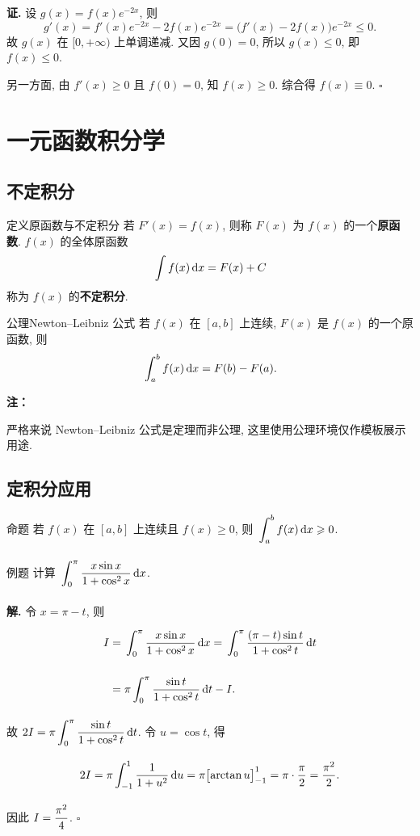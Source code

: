 \documentclass[a4paper,12pt,oneside,fontset=none]{ctexbook}
\renewcommand{\ge}{\geqslant}
\renewcommand{\le}{\leqslant}
\let\olddfrac\dfrac
\renewcommand{\dfrac}[2]{
	\olddfrac{#1\vrule width 0pt height 1.15em depth 0em}{#2\vrule width 0pt height 0em depth 0.6em}
}
\let\oldint\int
\renewcommand{\int}{\displaystyle{\vrule width 0pt height 0em depth 0em}\oldint}
\newenvironment{proposition}[1][]{\begin{thmBox}{命题}{#1}}{\end{thmBox}}
\newcounter{definition}[chapter]
\newenvironment{definition}[1][]{\begin{defBox}{定义}{#1}}{\end{defBox}}
\newenvironment{axiom}[1][]{\begin{defBox}{公理}{#1}}{\end{defBox}}
\newcounter{example}[chapter]
\newenvironment{example}[1][]{\begin{exBox}{例题}{#1}}{\end{exBox}}
\newenvironment{note}{
	\par\vspace{0.5em}\noindent
	\textbf{\color{NoteColor} 注：}
}{
	\par\vspace{0.5em}
}
\numberwithin{equation}{chapter}
\begin{document}
	\textbf{证.} 设 $g(x) = f(x)e^{-2x}$, 则
	\[
	g'(x) = f'(x)e^{-2x} - 2f(x)e^{-2x} = \bigl(f'(x) - 2f(x)\bigr)e^{-2x} \le 0.
	\]
	故 $g(x)$ 在 $[0, +\infty)$ 上单调递减. 又因 $g(0) = 0$, 所以 $g(x) \le 0$, 即 $f(x) \le 0$.
	
	另一方面, 由 $f'(x) \ge 0$ 且 $f(0) = 0$, 知 $f(x) \ge 0$. 综合得 $f(x) \equiv 0$. \hfill $\square$
	
	\chapter{一元函数积分学}
	
	\section{不定积分}
	
	\begin{definition}[原函数与不定积分]
		若 $F'(x) = f(x)$, 则称 $F(x)$ 为 $f(x)$ 的一个\textbf{原函数}. $f(x)$ 的全体原函数
		\[
		\int f(x)\,\mathrm{d}x = F(x) + C
		\]
		称为 $f(x)$ 的\textbf{不定积分}.
	\end{definition}
	
	\begin{axiom}[Newton--Leibniz 公式]
		若 $f(x)$ 在 $[a, b]$ 上连续, $F(x)$ 是 $f(x)$ 的一个原函数, 则
		\[
		\int_a^b f(x)\,\mathrm{d}x = F(b) - F(a).
		\]
	\end{axiom}
	
	\begin{note}
		严格来说 Newton--Leibniz 公式是定理而非公理, 这里使用公理环境仅作模板展示用途.
	\end{note}
	
	\section{定积分应用}
	
	\begin{proposition}
		若 $f(x)$ 在 $[a, b]$ 上连续且 $f(x) \ge 0$, 则 $\int_a^b f(x)\,\mathrm{d}x \ge 0$.
	\end{proposition}
	
	\begin{example}
		计算 $\int_0^{\pi} \dfrac{x\sin x}{1 + \cos^2 x}\,\mathrm{d}x$.
	\end{example}
	
	\textbf{解.} 令 $x = \pi - t$, 则
	\begin{align*}
		I &= \int_0^{\pi} \dfrac{x\sin x}{1 + \cos^2 x}\,\mathrm{d}x 
		= \int_0^{\pi} \dfrac{(\pi - t)\sin t}{1 + \cos^2 t}\,\mathrm{d}t \\[6pt]
		&= \pi\int_0^{\pi}\dfrac{\sin t}{1 + \cos^2 t}\,\mathrm{d}t - I.
	\end{align*}
	故 $2I = \pi\int_0^{\pi}\dfrac{\sin t}{1 + \cos^2 t}\,\mathrm{d}t$. 令 $u = \cos t$, 得
	\[
	2I = \pi\int_{-1}^{1}\dfrac{1}{1 + u^2}\,\mathrm{d}u = \pi\bigl[\arctan u\bigr]_{-1}^{1} = \pi\cdot\dfrac{\pi}{2} = \dfrac{\pi^2}{2}.
	\]
	因此 $I = \dfrac{\pi^2}{4}$. \hfill $\square$
	
\end{document}
